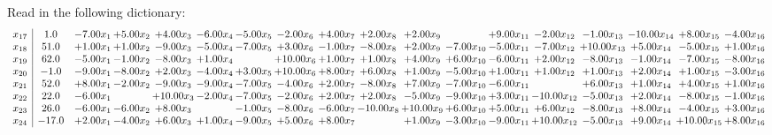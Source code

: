 \documentclass[9pt]{article}
\begin{document}
Read in the following dictionary:
\[\begin{array}{c| c c@{\hskip 2pt} c@{\hskip 2pt} c@{\hskip 2pt} c@{\hskip 2pt} c@{\hskip 2pt} c@{\hskip 2pt} c@{\hskip 2pt} c@{\hskip 2pt} c@{\hskip 2pt} c@{\hskip 2pt} c@{\hskip 2pt} c@{\hskip 2pt} c@{\hskip 2pt} c@{\hskip 2pt} c@{\hskip 2pt} c@{\hskip 2pt} }
 x_{17}   &  1.0 & -7.00 x_{1} & +  5.00 x_{2} & +  4.00 x_{3} & -6.00 x_{4} & -5.00 x_{5} & -2.00 x_{6} & +  4.00 x_{7} & +  2.00 x_{8} & +  2.00 x_{9} &   & +  9.00 x_{11} & -2.00 x_{12} & -1.00 x_{13} & -10.00 x_{14} & +  8.00 x_{15} & -4.00 x_{16}\\
 x_{18}   &  51.0 & +  1.00 x_{1} & +  1.00 x_{2} & -9.00 x_{3} & -5.00 x_{4} & -7.00 x_{5} & +  3.00 x_{6} & -1.00 x_{7} & -8.00 x_{8} & +  2.00 x_{9} & -7.00 x_{10} & -5.00 x_{11} & -7.00 x_{12} & + 10.00 x_{13} & +  5.00 x_{14} & -5.00 x_{15} & +  1.00 x_{16}\\
 x_{19}   &  62.0 & -5.00 x_{1} & -1.00 x_{2} & -8.00 x_{3} & +  1.00 x_{4} &   & + 10.00 x_{6} & +  1.00 x_{7} & +  1.00 x_{8} & +  4.00 x_{9} & +  6.00 x_{10} & -6.00 x_{11} & +  2.00 x_{12} & -8.00 x_{13} & -1.00 x_{14} & -7.00 x_{15} & -8.00 x_{16}\\
 x_{20}   &  -1.0 & -9.00 x_{1} & -8.00 x_{2} & +  2.00 x_{3} & -4.00 x_{4} & +  3.00 x_{5} & + 10.00 x_{6} & +  8.00 x_{7} & +  6.00 x_{8} & +  1.00 x_{9} & -5.00 x_{10} & +  1.00 x_{11} & +  1.00 x_{12} & +  1.00 x_{13} & +  2.00 x_{14} & +  1.00 x_{15} & -3.00 x_{16}\\
 x_{21}   &  52.0 & +  8.00 x_{1} & -2.00 x_{2} & -9.00 x_{3} & -9.00 x_{4} & -7.00 x_{5} & -4.00 x_{6} & +  2.00 x_{7} & -8.00 x_{8} & +  7.00 x_{9} & -7.00 x_{10} & -6.00 x_{11} &   & +  6.00 x_{13} & +  1.00 x_{14} & +  4.00 x_{15} & +  1.00 x_{16}\\
 x_{22}   &  22.0 & -6.00 x_{1} &   & + 10.00 x_{3} & -2.00 x_{4} & -7.00 x_{5} & -2.00 x_{6} & +  2.00 x_{7} & +  2.00 x_{8} & -5.00 x_{9} & -9.00 x_{10} & +  3.00 x_{11} & -10.00 x_{12} & -5.00 x_{13} & +  2.00 x_{14} & -8.00 x_{15} & -1.00 x_{16}\\
 x_{23}   &  26.0 & -6.00 x_{1} & -6.00 x_{2} & +  8.00 x_{3} &   & -1.00 x_{5} & -8.00 x_{6} & -6.00 x_{7} & -10.00 x_{8} & + 10.00 x_{9} & +  6.00 x_{10} & +  5.00 x_{11} & +  6.00 x_{12} & -8.00 x_{13} & +  8.00 x_{14} & -4.00 x_{15} & +  3.00 x_{16}\\
 x_{24}   &  -17.0 & +  2.00 x_{1} & -4.00 x_{2} & +  6.00 x_{3} & +  1.00 x_{4} & -9.00 x_{5} & +  5.00 x_{6} & +  8.00 x_{7} &   & +  1.00 x_{9} & -3.00 x_{10} & -9.00 x_{11} & + 10.00 x_{12} & -5.00 x_{13} & +  9.00 x_{14} & + 10.00 x_{15} & +  8.00 x_{16}\\

\end{array}\]
\end{document}
